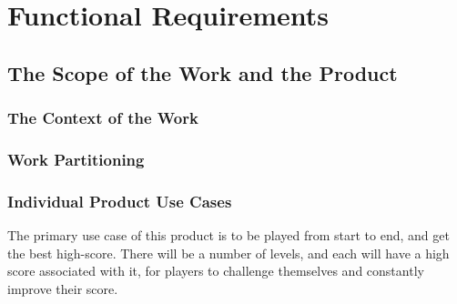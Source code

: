 \documentclass[12pt, titlepage]{article}
\begin{document}
\section{Functional Requirements}

\subsection{The Scope of the Work and the Product}

\subsubsection{The Context of the Work}

\subsubsection{Work Partitioning}

\subsubsection{Individual Product Use Cases}
The primary use case of this product is to be played from start to end, and get the best high-score. There will be a number of levels, and each will have a high score associated with it, for players to challenge themselves and constantly improve their score.
\end{document}
